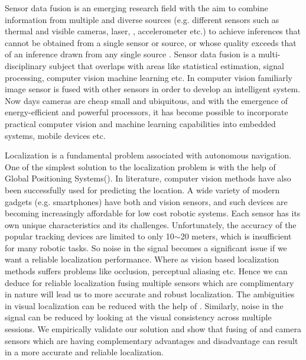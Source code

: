 Sensor data fusion is an emerging research field with the aim to combine information from multiple and diverse sources (e.g. different sensors such as thermal and visible cameras, laser, \gps, accelerometer etc.) to achieve inferences that cannot be obtained from a single sensor or source, or whose quality exceeds that of an inference drawn from any single source \cite{bonnifait2001data, koneru2011fuzzy}. Sensor data fusion is a multi-disciplinary subject that overlaps with areas like statistical estimation, signal processing, computer vision machine learning etc. In computer vision familiarly image sensor is fused with other sensors in order to develop an intelligent 
system. Now days cameras are cheap small and ubiquitous, and with the emergence of energy-efficient and powerful processors, it has become possible to incorporate practical computer vision and machine learning capabilities into embedded systems, mobile devices etc. \par
Localization is a fundamental problem associated with autonomous navigation. One of the simplest solution to the localization problem is with the help of Global Positioning Systems(\gps). In literature, computer vision methods have also been successfully used for predicting the location. A wide variety of modern gadgets (e.g. smartphones) have both \gps and vision sensors, and such devices are becoming increasingly affordable for low cost robotic systems. Each sensor has its own unique characteristics and its challenges. Unfortunately, the accuracy of the popular \gps tracking devices are limited to only 10$\sim$20 meters, which is insufficient for many robotic tasks\cite{hays2008im2gps}. So noise in the \gps signal becomes a significant issue if we want a reliable localization performance. Where as vision based localization methods suffers problems like occlusion, perceptual aliasing etc. Hence we can deduce for reliable localization fusing multiple sensors which are complimentary in nature will lead us to more accurate and robust localization. The ambiguities in visual localization can be reduced with the help of \gps. Similarly, noise in the \gps signal can be reduced by looking at the visual consistency across multiple sessions. We empirically validate our solution and show that fusing of \gps and camera sensors which are having complementary advantages and disadvantage can result in a more accurate and reliable localization. \par
